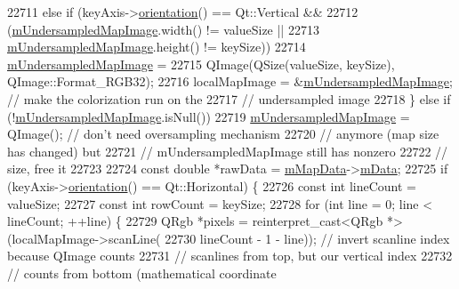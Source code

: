 \begin{DoxyCode}
22711     \textcolor{keywordflow}{else} \textcolor{keywordflow}{if} (keyAxis->\hyperlink{class_q_c_p_axis_a57483f2f60145ddc9e63f3af53959265}{orientation}() == Qt::Vertical &&
22712              (\hyperlink{class_q_c_p_color_map_acad3d52f3572436d5f2e4057911ea8d3}{mUndersampledMapImage}.width() != valueSize ||
22713               \hyperlink{class_q_c_p_color_map_acad3d52f3572436d5f2e4057911ea8d3}{mUndersampledMapImage}.height() != keySize))
22714       \hyperlink{class_q_c_p_color_map_acad3d52f3572436d5f2e4057911ea8d3}{mUndersampledMapImage} =
22715           QImage(QSize(valueSize, keySize), QImage::Format\_RGB32);
22716     localMapImage = &\hyperlink{class_q_c_p_color_map_acad3d52f3572436d5f2e4057911ea8d3}{mUndersampledMapImage}; \textcolor{comment}{// make the colorization run on the}
22717                                             \textcolor{comment}{// undersampled image}
22718   \} \textcolor{keywordflow}{else} \textcolor{keywordflow}{if} (!\hyperlink{class_q_c_p_color_map_acad3d52f3572436d5f2e4057911ea8d3}{mUndersampledMapImage}.isNull())
22719     \hyperlink{class_q_c_p_color_map_acad3d52f3572436d5f2e4057911ea8d3}{mUndersampledMapImage} = QImage(); \textcolor{comment}{// don't need oversampling mechanism}
22720                                       \textcolor{comment}{// anymore (map size has changed) but}
22721                                       \textcolor{comment}{// mUndersampledMapImage still has nonzero}
22722                                       \textcolor{comment}{// size, free it}
22723 
22724   \textcolor{keyword}{const} \textcolor{keywordtype}{double} *rawData = \hyperlink{class_q_c_p_color_map_a8709272aa8f0be3ca111bf3866806f8b}{mMapData}->\hyperlink{class_q_c_p_color_map_data_ac1682862022f575191351c9825187d39}{mData};
22725   \textcolor{keywordflow}{if} (keyAxis->\hyperlink{class_q_c_p_axis_a57483f2f60145ddc9e63f3af53959265}{orientation}() == Qt::Horizontal) \{
22726     \textcolor{keyword}{const} \textcolor{keywordtype}{int} lineCount = valueSize;
22727     \textcolor{keyword}{const} \textcolor{keywordtype}{int} rowCount = keySize;
22728     \textcolor{keywordflow}{for} (\textcolor{keywordtype}{int} line = 0; line < lineCount; ++line) \{
22729       QRgb *pixels = \textcolor{keyword}{reinterpret\_cast<}QRgb *\textcolor{keyword}{>}(localMapImage->scanLine(
22730           lineCount - 1 - line)); \textcolor{comment}{// invert scanline index because QImage counts}
22731                                   \textcolor{comment}{// scanlines from top, but our vertical index}
22732                                   \textcolor{comment}{// counts from bottom (mathematical coordinate}

\end{DoxyCode}
